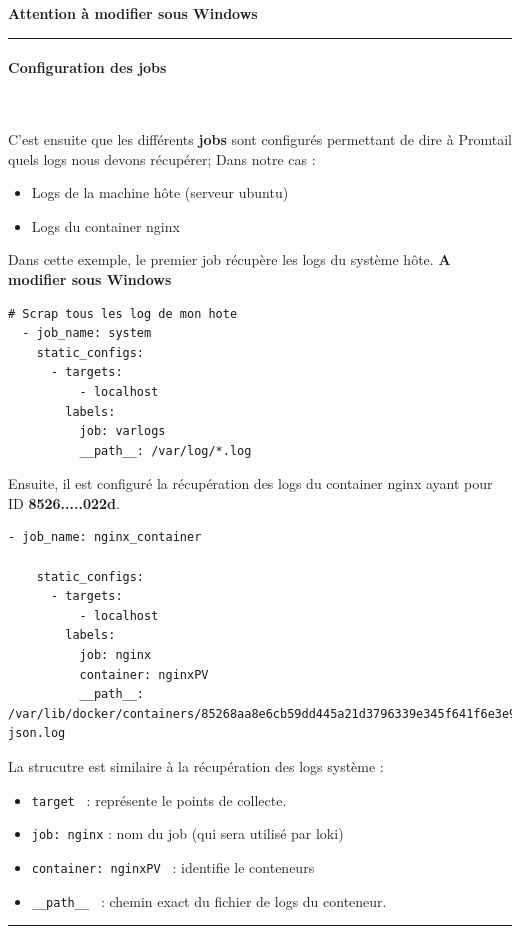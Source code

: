 \documentclass[french, 12pt]{article}%
\newcommand{\itemE}{\item[$\bullet$]}
\begin{document}
\textbf{Attention à modifier sous Windows}



\begin{center}
 \rule{0.5\linewidth}{1pt}
 \end{center}
\paragraph{Configuration des jobs}\ 

C'est ensuite que les différents \textbf{jobs} sont configurés permettant de dire à Promtail quels logs nous devons récupérer; Dans notre cas : 
\begin{itemize}
\itemE Logs de la machine hôte (serveur ubuntu)
\itemE Logs du container nginx
\end{itemize}



Dans cette exemple, le premier job récupère les logs du système hôte. \textbf{A modifier sous Windows}
\begin{lstlisting}[style=commande]
  # Scrap tous les log de mon hote
  - job_name: system
    static_configs:
      - targets:
          - localhost
        labels:
          job: varlogs
          __path__: /var/log/*.log
\end{lstlisting}

Ensuite, il est configuré la récupération des logs du container nginx  ayant pour ID \textbf{8526.....022d}. 
\begin{lstlisting}[style=commande]
- job_name: nginx_container

    static_configs:
      - targets:
          - localhost
        labels:
          job: nginx
          container: nginxPV
          __path__: /var/lib/docker/containers/85268aa8e6cb59dd445a21d3796339e345f641f6e3e91b7606b7d495c342022d/85268aa8e6cb59dd445a21d3796339e345f641f6e3e91b7606b7d495c342022d-json.log
\end{lstlisting}
La strucutre est similaire à la récupération des logs système : 
\begin{itemize}
\itemE \verb?target ? : représente le points de collecte.
\itemE \verb?job: nginx? : nom du job (qui sera utilisé par loki)
\itemE \verb?container: nginxPV ? : identifie le conteneurs 
\itemE \verb?__path__ ? : chemin exact du fichier de logs du conteneur.
\end{itemize}


\begin{center}
 \rule{0.5\linewidth}{1pt}
 \end{center}
\end{document}
